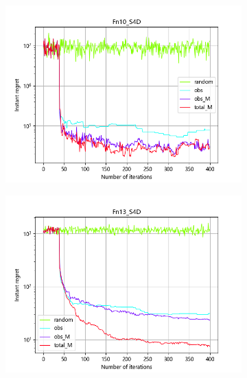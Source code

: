 \documentclass{article}
\begin{document}
\begin{figure}[H]
\begin{subfigure}[t]{.32\linewidth}
        \includegraphics[width=1\textwidth]{pictures/Homo_noise_4D/S/Fn10_S4D_ins.png}
    \end{subfigure}
    \begin{subfigure}[t]{.32\linewidth}
        \centering
        \includegraphics[width=1\textwidth]{pictures/Homo_noise_4D/S/Fn13_S4D_ins.png}
    \end{subfigure}
    \begin{subfigure}[t]{.32\linewidth}
        \centering

\end{subfigure}
\end{figure}
\end{document}
